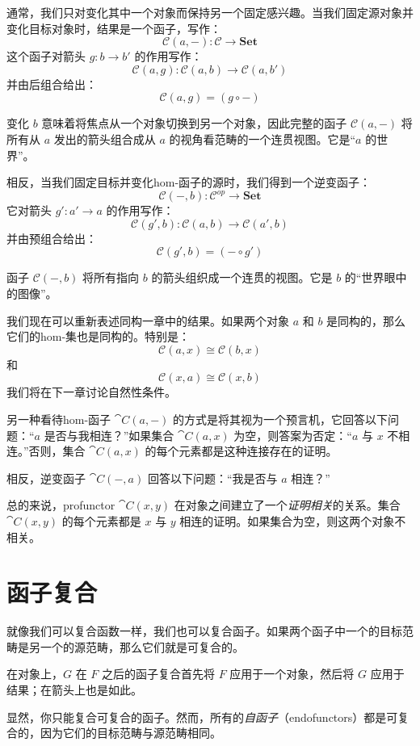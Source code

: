 \documentclass[DaoFP]{subfiles}
\begin{document}
通常，我们只对变化其中一个对象而保持另一个固定感兴趣。当我们固定源对象并变化目标对象时，结果是一个函子，写作：
\[ \mathcal{C}(a, -) \colon \mathcal{C} \to \mathbf{Set} \]
这个函子对箭头 $g \colon b \to b'$ 的作用写作：
\[ \mathcal{C}(a, g) \colon \mathcal{C}(a, b) \to \mathcal{C}(a, b') \]
并由后组合给出：
\[\mathcal{C}(a, g) = (g \circ -) \]

变化 $b$ 意味着将焦点从一个对象切换到另一个对象，因此完整的函子 $\mathcal{C}(a, -)$ 将所有从 $a$ 发出的箭头组合成从 $a$ 的视角看范畴的一个连贯视图。它是“$a$ 的世界”。

相反，当我们固定目标并变化hom-函子的源时，我们得到一个逆变函子：
\[ \mathcal{C}(-, b) \colon \mathcal{C}^{op} \to \mathbf{Set} \]
它对箭头 $g' \colon a' \to a$ 的作用写作：
\[ \mathcal{C}(g', b) \colon \mathcal{C}(a, b) \to \mathcal{C}(a', b) \]
并由预组合给出：
\[\mathcal{C}(g', b) = (- \circ g') \]

函子 $\mathcal{C}(-, b)$ 将所有指向 $b$ 的箭头组织成一个连贯的视图。它是 $b$ 的“世界眼中的图像”。

我们现在可以重新表述同构一章中的结果。如果两个对象 $a$ 和 $b$ 是同构的，那么它们的hom-集也是同构的。特别是：
\[\mathcal{C}(a, x) \cong \mathcal{C}(b, x)\]
和
\[\mathcal{C}(x, a) \cong \mathcal{C}(x, b)\]
我们将在下一章讨论自然性条件。

另一种看待hom-函子 $\cat C(a, -)$ 的方式是将其视为一个预言机，它回答以下问题：“$a$ 是否与我相连？”如果集合 $\cat C(a, x)$ 为空，则答案为否定：“$a$ 与 $x$ 不相连。”否则，集合 $\cat C(a, x)$ 的每个元素都是这种连接存在的证明。

相反，逆变函子 $\cat C (-, a)$ 回答以下问题：“我是否与 $a$ 相连？”

总的来说，profunctor $\cat C(x, y)$ 在对象之间建立了一个\emph{证明相关}的关系。集合 $\cat C(x, y)$ 的每个元素都是 $x$ 与 $y$ 相连的证明。如果集合为空，则这两个对象不相关。

\section{函子复合}

就像我们可以复合函数一样，我们也可以复合函子。如果两个函子中一个的目标范畴是另一个的源范畴，那么它们就是可复合的。

在对象上，$G$ 在 $F$ 之后的函子复合首先将 $F$ 应用于一个对象，然后将 $G$ 应用于结果；在箭头上也是如此。

显然，你只能复合可复合的函子。然而，所有的\emph{自函子}（endofunctors）都是可复合的，因为它们的目标范畴与源范畴相同。
\end{document}
